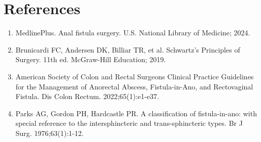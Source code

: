 \section*{References}
\begin{enumerate}
  \item MedlinePlus. Anal fistula surgery. U.S. National Library of Medicine; 2024.
  \item Brunicardi FC, Andersen DK, Billiar TR, et al. Schwartz's Principles of Surgery. 11th ed. McGraw-Hill Education; 2019.
  \item American Society of Colon and Rectal Surgeons Clinical Practice Guidelines for the Management of Anorectal Abscess, Fistula-in-Ano, and Rectovaginal Fistula. Dis Colon Rectum. 2022;65(1):e1-e37.
  \item Parks AG, Gordon PH, Hardcastle PR. A classification of fistula-in-ano: with special reference to the intersphincteric and trans-sphincteric types. Br J Surg. 1976;63(1):1-12.
\end{enumerate}

\clearpage
